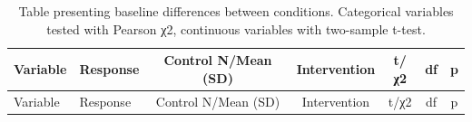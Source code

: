 \documentclass[]{article}
\theoremstyle{definition}
\theoremstyle{definition}
\theoremstyle{definition}
\theoremstyle{remark}
\begin{document}
\begin{longtable}[]{@{}llccccc@{}}
\caption{Table presenting baseline differences between conditions.
Categorical variables tested with Pearson χ2, continuous variables with
two-sample t-test.}\tabularnewline
\toprule
\begin{minipage}[b]{0.09\columnwidth}\raggedright\strut
Variable\strut
\end{minipage} & \begin{minipage}[b]{0.24\columnwidth}\raggedright\strut
Response\strut
\end{minipage} & \begin{minipage}[b]{0.16\columnwidth}\centering\strut
Control N/Mean (SD)\strut
\end{minipage} & \begin{minipage}[b]{0.12\columnwidth}\centering\strut
Intervention\strut
\end{minipage} & \begin{minipage}[b]{0.07\columnwidth}\centering\strut
t/χ2\strut
\end{minipage} & \begin{minipage}[b]{0.06\columnwidth}\centering\strut
df\strut
\end{minipage} & \begin{minipage}[b]{0.06\columnwidth}\centering\strut
p\strut
\end{minipage}\tabularnewline
\midrule
\endfirsthead
\toprule
\begin{minipage}[b]{0.09\columnwidth}\raggedright\strut
Variable\strut
\end{minipage} & \begin{minipage}[b]{0.24\columnwidth}\raggedright\strut
Response\strut
\end{minipage} & \begin{minipage}[b]{0.16\columnwidth}\centering\strut
Control N/Mean (SD)\strut
\end{minipage} & \begin{minipage}[b]{0.12\columnwidth}\centering\strut
Intervention\strut
\end{minipage} & \begin{minipage}[b]{0.07\columnwidth}\centering\strut
t/χ2\strut
\end{minipage} & \begin{minipage}[b]{0.06\columnwidth}\centering\strut
df\strut
\end{minipage} & \begin{minipage}[b]{0.06\columnwidth}\centering\strut
p\strut
\end{minipage}\tabularnewline

\end{longtable}
\end{document}
